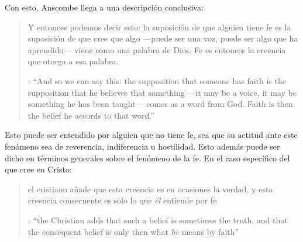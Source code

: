 Con esto, Anscombe llega a una descripción conclusiva: \blockquote[{\cite[119--120]{anscombe1981erp:faith}}: \enquote{And so we can say this: the supposition that someone has faith is the supposition that he believes that something ---it may be a voice, it may be something he has been taught--- comes as a word from God. Faith is then the belief he accords to that word.}]{Y entonces podemos decir esto: la suposición de que alguien tiene fe es la suposición de que cree que algo ---puede ser una voz, puede ser algo que ha aprendido--- viene como una palabra de Dios. Fe es entonces la creencia que otorga a esa palabra.} Esto puede ser entendido por alguien que no tiene fe, sea que su actitud ante este fenómeno sea de reverencia, indiferencia u hostilidad. Esto además puede ser dicho en términos generales sobre el fenómeno de la fe. En el caso específico del que cree en Cristo: \blockquote[{\cite[120]{anscombe1981erp:faith}}: \enquote{the Christian adds that such a belief is sometimes the truth, and that the consequent belief is only then what \emph{he} means by faith}]{el cristiano añade que esta creencia es en ocasiones la verdad, y esta creencia consecuente es solo lo que \emph{él} entiende por fe}.
